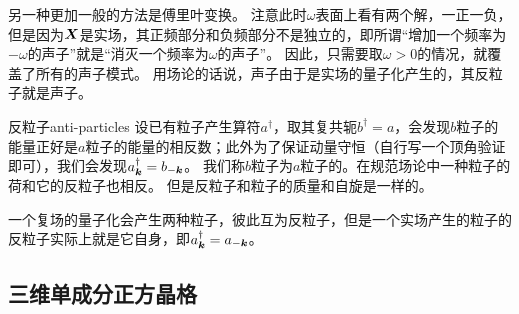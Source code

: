 另一种更加一般的方法是傅里叶变换。%
注意此时$\omega$表面上看有两个解，一正一负，但是因为$\vb*{X}$是实场，其正频部分和负频部分不是独立的，即所谓“增加一个频率为$-\omega$的声子”就是“消灭一个频率为$\omega$的声子”。
因此，只需要取$\omega > 0$的情况，就覆盖了所有的声子模式。
用场论的话说，声子由于是实场的量子化产生的，其反粒子就是声子。

\begin{back}{反粒子}{anti-particles}
    设已有粒子产生算符$a^\dagger$，取其复共轭$b^\dagger = a$，会发现$b$粒子的能量正好是$a$粒子的能量的相反数；此外为了保证动量守恒（自行写一个顶角验证即可），我们会发现$a^\dagger_{\vb*{k}} = b_{- \vb*{k}}$。
    我们称$b$粒子为$a$粒子的。在规范场论中一种粒子的荷和它的反粒子也相反。
    但是反粒子和粒子的质量和自旋是一样的。

    一个复场的量子化会产生两种粒子，彼此互为反粒子，但是一个实场产生的粒子的反粒子实际上就是它自身，即$a^\dagger_{\vb*{k}} = a_{- \vb*{k}}$。
\end{back}

\subsection{三维单成分正方晶格}\label{sec:3d-single-component-lattice}

